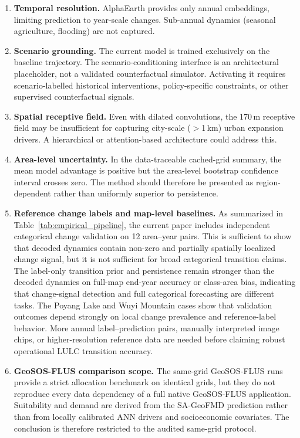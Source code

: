 \documentclass{article}
\begin{document}
\begin{enumerate}
\item \textbf{Temporal resolution.} AlphaEarth provides only annual embeddings, limiting prediction to year-scale changes. Sub-annual dynamics (seasonal agriculture, flooding) are not captured.

\item \textbf{Scenario grounding.} The current model is trained exclusively on the baseline trajectory. The scenario-conditioning interface is an architectural placeholder, not a validated counterfactual simulator. Activating it requires scenario-labelled historical interventions, policy-specific constraints, or other supervised counterfactual signals.

\item \textbf{Spatial receptive field.} Even with dilated convolutions, the 170\,m receptive field may be insufficient for capturing city-scale ($>$1\,km) urban expansion drivers. A hierarchical or attention-based architecture could address this.

\item \textbf{Area-level uncertainty.} In the data-traceable cached-grid summary, the mean model advantage is positive but the area-level bootstrap confidence interval crosses zero. The method should therefore be presented as region-dependent rather than uniformly superior to persistence.

\item \textbf{Reference change labels and map-level baselines.} As summarized in Table~\ref{tab:empirical_pipeline}, the current paper includes independent categorical change validation on 12 area--year pairs. This is sufficient to show that decoded dynamics contain non-zero and partially spatially localized change signal, but it is not sufficient for broad categorical transition claims. The label-only transition prior and persistence remain stronger than the decoded dynamics on full-map end-year accuracy or class-area bias, indicating that change-signal detection and full categorical forecasting are different tasks. The Poyang Lake and Wuyi Mountain cases show that validation outcomes depend strongly on local change prevalence and reference-label behavior. More annual label--prediction pairs, manually interpreted image chips, or higher-resolution reference data are needed before claiming robust operational LULC transition accuracy.

\item \textbf{GeoSOS-FLUS comparison scope.} The same-grid GeoSOS-FLUS runs provide a strict allocation benchmark on identical grids, but they do not reproduce every data dependency of a full native GeoSOS-FLUS application. Suitability and demand are derived from the SA-GeoFMD prediction rather than from locally calibrated ANN drivers and socioeconomic covariates. The conclusion is therefore restricted to the audited same-grid protocol.
\end{enumerate}
\end{document}
